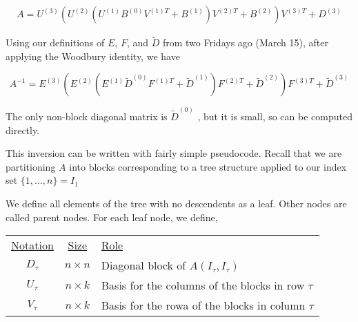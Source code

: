 \begin{align*}
    A = U^{(3)}
    \left( U^{(2)}
        \left( U^{(1)} B^{(0)} V^{(1)T} + B^{(1)} \right)
        V^{(2)T} +B^{(2)}
    \right)V^{(3)T} + D^{(3)}
\end{align*}



\begin{center}
    
\end{center}

\begin{center}
    
\end{center}

\begin{center}
    
\end{center}


Using our definitions of $E$, $F$, and $\widetilde{D}$ from two Fridays ago (March 15), after applying the Woodbury identity, we have

\begin{equation*}
    A^{-1} = E^{(3)}
    \left(
        E^{(2)}
        \left(
            E^{(1)} \widetilde{D}^{(0)} F^{(1)T}
            + \widetilde{D}^{(1)}
        \right) F^{(2)T} + \widetilde{D}^{(2)}
    \right) F^{(3)T} + \widetilde{D}^{(3)}
\end{equation*}

The only non-block diagonal matrix is $\widetilde{D}^{(0)}$
, but it is small, so can be computed directly.

This inversion can be written with fairly simple pseudocode. Recall that we are partitioning $A$ into blocks corresponding to a tree structure applied to our index set $\{ 1, \ldots, n \} = I_1$


\begin{center}
    
\end{center}

We define all elements of the tree with no descendents as a leaf. Other nodes are called parent nodes. For each leaf node, we define,

\begin{tabular}{ccl}
    \underline{Notation} & \underline{Size} &
    \underline{Role}\\
    $D_{\tau}$ & $n \times n$ & Diagonal block of $A(I_{\tau}, I_{\tau})$ \\
    $U_{\tau}$ & $n \times k$ & Basis for the columns of the blocks in row $\tau$\\
    $V_{\tau}$ & $n \times k$ & Basis for the rowa of the blocks in column $\tau$\\
\end{tabular}

